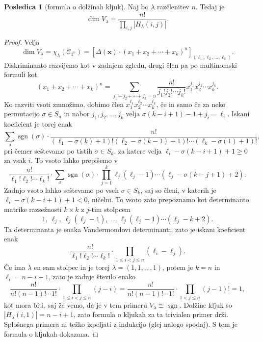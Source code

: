 \documentclass[11pt]{book}
\def\conclass{\mathcal{C}}
\DeclareMathOperator\sgn{sgn}
\theoremstyle{definition}
\theoremstyle{zgled}
\theoremstyle{zgledbrezstevilke}
\theoremstyle{odprtproblem}
\theoremstyle{domacanaloga}
\newenvironment{dokaz}
    {\color{siva}\begin{proof}}
    {\end{proof}}
\theoremstyle{izrek}
\newtheorem{posledica}[theorem]{Posledica}
\begin{document}
\begin{posledica}[formula o dolžinah kljuk]
Naj bo $\lambda$ razčlenitev $n$. Tedaj je
\[
    \dim V_{\lambda} = \frac{n!}{\prod_{i,j} |H_{\lambda}(i,j)|}.
\]
\end{posledica}
\begin{dokaz}
Velja 
\[
    \dim V_{\lambda} = \chi_{\lambda}(\conclass_{1^n}) =
    \left[ \Delta(\mathbf{x}) \cdot (x_1 + x_2 + \cdots + x_k)^n \right]_{(\ell_1, \ell_2, \dots, \ell_k)}.
\]
Diskriminanto razvijemo kot v zadnjem zgledu, drugi člen pa po multinomski formuli kot
\[
    (x_1 + x_2 + \cdots + x_k)^n = \sum_{j_1 + j_2 + \cdots + j_k = n} \frac{n!}{j_1! j_2! \cdots j_k!} x_1^{j_1} x_2^{j_2} \cdots x_k^{j_k}.
\]
Ko razviti vsoti zmnožimo, dobimo člen $x_1^{\ell_1} x_2^{\ell_2} \cdots x_k^{\ell_k}$, če in samo če za neko permutacijo $\sigma \in S_n$ in nabor $j_1, j_2, \dots, j_k$ velja $\sigma(k - i + 1) - 1 + j_i = \ell_i$. Iskani koeficient je torej enak
\[
    \sum_{\sigma} \sgn(\sigma) \cdot \frac{n!}{(\ell_1 - \sigma(k) + 1)! (\ell_2 - \sigma(k-1) + 1)! \cdots (\ell_k - \sigma(1) + 1)!},
\]
pri čemer seštevamo po tistih $\sigma \in S_k$, za katere velja $\ell_i - \sigma(k-i+1) + 1 \geq 0$ za vsak $i$. To vsoto lahko prepišemo v
\[
    \frac{n!}{\ell_1! \ell_2! \cdots \ell_k!} \cdot \sum_{\sigma} \sgn(\sigma) \cdot \prod_{j = 1}^k \ell_j (\ell_j - 1) \cdots (\ell_j - \sigma(k-j+1) + 2). 
\]
Zadnjo vsoto lahko seštevamo po vseh $\sigma \in S_k$, saj so členi, v katerih je $\ell_i - \sigma(k-i+1) + 1 < 0$, ničelni. To vsoto zato prepoznamo kot determinanto matrike razsežnosti $k \times k$ z $j$-tim stolpcem
\[
    1, \ \ell_j, \ \ell_j(\ell_j - 1), \ \dots, \ell_j(\ell_j - 1) \cdots (\ell_j - k + 2). 
\]
Ta determinanta je enaka Vandermondovi determinanti, zato je iskani koeficient enak
\[
    \frac{n!}{\ell_1! \ell_2! \cdots \ell_k!} \cdot \prod_{1 \leq i < j \leq n} (\ell_i - \ell_j).
\]
Če ima $\lambda$ en sam stolpec in je torej $\lambda = (1,1,\dots,1)$, potem je $k = n$ in $\ell_i = n - i + 1$, zato je zadnje število enako
\[
    \frac{n!}{n! (n-1)! \cdots 1!} \cdot \prod_{1 \leq i < j \leq n} (j-i) =
    \frac{n!}{n! (n-1)! \cdots 1!} \cdot \prod_{1 < j \leq n} (j-1)! =
    1,
\]
kot mora biti, saj že vemo, da je v tem primeru $V_{\lambda} \cong \sgn$. Dolžine kljuk so $|H_{\lambda}(i,1)| = n - i + 1$, zato formula o kljukah za ta trivialen primer drži. Splošnega primera ni težko izpeljati z indukcijo (glej nalogo spodaj). S tem je formula o kljukah dokazana.
\end{dokaz}
\end{document}
